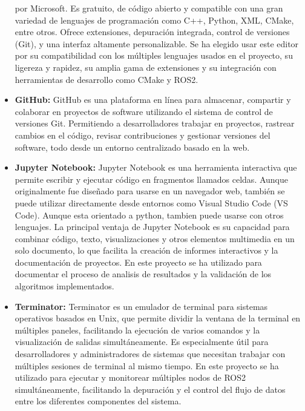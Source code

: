 \documentclass[12pt, a4paper, twoside]{article}
\begin{document}
\begin{itemize}
      por Microsoft. Es gratuito, de código abierto y compatible con una gran variedad de lenguajes de programación como C++, 
      Python, XML, CMake, entre otros. Ofrece extensiones, depuración integrada, control de versiones (Git), y una interfaz 
      altamente personalizable. Se ha elegido usar este editor por su compatibilidad con los múltiples lenguajes usados en el 
      proyecto, su ligereza y rapidez, su amplia gama de extensiones y su integración con herramientas de desarrollo como CMake y ROS2.
      \item \textbf{GitHub:} GitHub es una plataforma en línea para almacenar, compartir y colaborar en proyectos de software utilizando 
      el sistema de control de versiones Git. Permitiendo a desarrolladores trabajar en proyectos, rastrear cambios en el código, 
      revisar contribuciones y gestionar versiones del software, todo desde un entorno centralizado basado en la web.
      \item \textbf{Jupyter Notebook:} Jupyter Notebook es una herramienta interactiva que permite escribir y ejecutar código 
      en fragmentos llamados celdas. Aunque originalmente fue diseñado para usarse en un navegador web, también se puede utilizar 
      directamente desde entornos como Visual Studio Code (VS Code). Aunque esta orientado a python, tambien puede usarse con otros 
      lenguajes. La principal ventaja de Jupyter Notebook es su capacidad para combinar código, texto, visualizaciones y otros elementos
      multimedia en un solo documento, lo que facilita la creación de informes interactivos y la documentación de proyectos. 
      En este proyecto se ha utilizado para documentar el proceso de analisis de resultados y la validación de los algoritmos implementados.
      \item \textbf{Terminator:} Terminator es un emulador de terminal para sistemas operativos basados en Unix, que permite dividir la
      ventana de la terminal en múltiples paneles, facilitando la ejecución de varios comandos y la visualización de salidas
      simultáneamente. Es especialmente útil para desarrolladores y administradores de sistemas que necesitan trabajar
      con múltiples sesiones de terminal al mismo tiempo. En este proyecto se ha utilizado para ejecutar y monitorear múltiples 
      nodos de ROS2 simultáneamente, facilitando la depuración y el control del flujo de datos entre los diferentes componentes del sistema.
\end{itemize}
\end{document}
